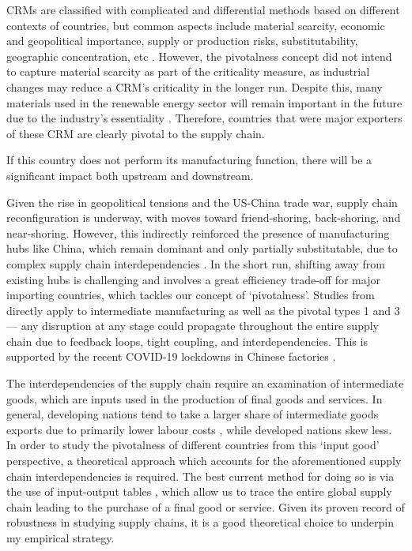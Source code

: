 \documentclass[11pt]{article}
\def\highlight#1#2{
	\begin{centering}
    
		\vspace{1.2ex}
		\begin{minipage}{0.8\linewidth}
			\begin{tcolorbox}[
				boxsep=3.3pt,
				boxrule=0.4pt,
				colback=white,
				colbacktitle=white,
				coltitle=black,
				colframe=black,
				title=\centering \textbf{#1},
			]
				\centering
				#2
			\end{tcolorbox}
		\end{minipage}
		\vspace{1.2ex}
        
	\end{centering}
}
\begin{document}
CRMs are classified with complicated and differential methods based on different contexts of countries, but common aspects include material scarcity, economic and geopolitical importance, supply or production risks, substitutability, geographic concentration, etc \citep{mancini2016}. However, the pivotalness concept did not intend to capture material scarcity as part of the criticality measure, as industrial changes may reduce a CRM’s criticality in the longer run. Despite this, many materials used in the renewable energy sector will remain important in the future due to the industry's essentiality \citep{kowalski2023}. Therefore, countries that were major exporters of these CRM are clearly pivotal to the supply chain.  

\highlight{Pivotal Type 2: Production}{If this country does not perform its manufacturing function, there will be a significant impact both upstream and downstream.}

Given the rise in geopolitical tensions and the US-China trade war, supply chain reconfiguration is underway, with moves toward friend-shoring, back-shoring, and near-shoring. However, this indirectly reinforced the presence of manufacturing hubs like China, which remain dominant and only partially substitutable, due to complex supply chain interdependencies \citep{alfaro2023}. In the short run, shifting away from existing hubs is challenging and involves a great efficiency trade-off for major importing countries, which tackles our concept of ‘pivotalness’. Studies from \citet{scheibe2018} directly apply to intermediate manufacturing as well as the pivotal types 1 and 3 — any disruption at any stage could propagate throughout the entire supply chain due to feedback loops, tight coupling, and interdependencies. This is supported by the recent COVID-19 lockdowns in Chinese factories \citep{lafrogne2022}.

The interdependencies of the supply chain require an examination of intermediate goods, which are inputs used in the production of final goods and services. In general, developing nations tend to take a larger share of intermediate goods exports due to primarily lower labour costs \citep{lazard2023supplychains}, while developed nations skew less. In order to study the pivotalness of different countries from this ‘input good’ perspective, a theoretical approach which accounts for the aforementioned supply chain interdependencies is required. The best current method for doing so is via the use of input-output tables \citep{leontief1951}, which allow us to trace the entire global supply chain leading to the purchase of a final good or service. Given its proven record of robustness in studying supply chains, it is a good theoretical choice to underpin my empirical strategy.
\end{document}
